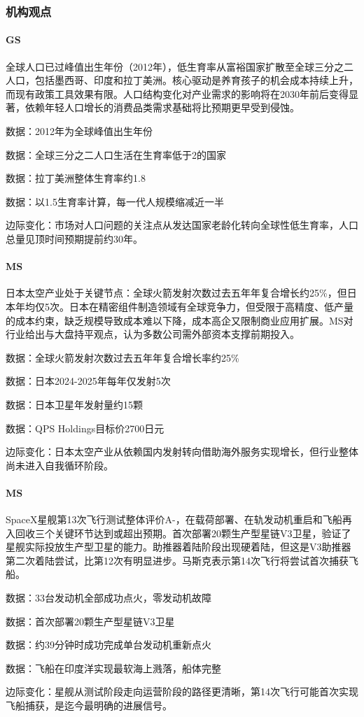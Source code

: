 \documentclass[11pt]{ctexart}
\begin{document}
\subsubsection*{机构观点}
\paragraph{GS} 全球人口已过峰值出生年份（2012年），低生育率从富裕国家扩散至全球三分之二人口，包括墨西哥、印度和拉丁美洲。核心驱动是养育孩子的机会成本持续上升，而现有政策工具效果有限。人口结构变化对产业需求的影响将在2030年前后变得显著，依赖年轻人口增长的消费品类需求基础将比预期更早受到侵蚀。
{\small\color{refgray}数据：2012年为全球峰值出生年份\par}
{\small\color{refgray}数据：全球三分之二人口生活在生育率低于2的国家\par}
{\small\color{refgray}数据：拉丁美洲整体生育率约1.8\par}
{\small\color{refgray}数据：以1.5生育率计算，每一代人规模缩减近一半\par}
{\small\color{refgray}边际变化：市场对人口问题的关注点从发达国家老龄化转向全球性低生育率，人口总量见顶时间预期提前约30年。\par}
\paragraph{MS} 日本太空产业处于关键节点：全球火箭发射次数过去五年年复合增长约25\%，但日本年均仅5次。日本在精密组件制造领域有全球竞争力，但受限于高精度、低产量的成本约束，缺乏规模导致成本难以下降，成本高企又限制商业应用扩展。MS对行业给出与大盘持平观点，认为多数公司需外部资本支撑前期投入。
{\small\color{refgray}数据：全球火箭发射次数过去五年年复合增长率约25\%\par}
{\small\color{refgray}数据：日本2024-2025年每年仅发射5次\par}
{\small\color{refgray}数据：日本卫星年发射量约15颗\par}
{\small\color{refgray}数据：QPS Holdings目标价2700日元\par}
{\small\color{refgray}边际变化：日本太空产业从依赖国内发射转向借助海外服务实现增长，但行业整体尚未进入自我循环阶段。\par}
\paragraph{MS} SpaceX星舰第13次飞行测试整体评价A-，在载荷部署、在轨发动机重启和飞船再入回收三个关键环节达到或超出预期。首次部署20颗生产型星链V3卫星，验证了星舰实际投放生产型卫星的能力。助推器着陆阶段出现硬着陆，但这是V3助推器第二次着陆尝试，比第12次有明显进步。马斯克表示第14次飞行将尝试首次捕获飞船。
{\small\color{refgray}数据：33台发动机全部成功点火，零发动机故障\par}
{\small\color{refgray}数据：首次部署20颗生产型星链V3卫星\par}
{\small\color{refgray}数据：约39分钟时成功完成单台发动机重新点火\par}
{\small\color{refgray}数据：飞船在印度洋实现最软海上溅落，船体完整\par}
{\small\color{refgray}边际变化：星舰从测试阶段走向运营阶段的路径更清晰，第14次飞行可能首次实现飞船捕获，是迄今最明确的进展信号。\par}
\end{document}
